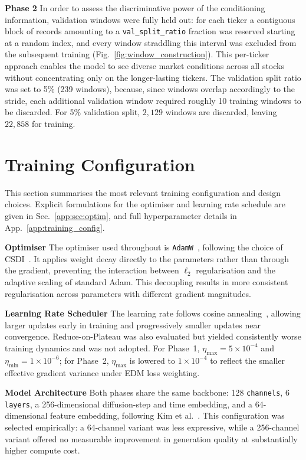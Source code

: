 \textbf{Phase 2} \quad In order to assess the discriminative power of the conditioning information, validation windows were fully held out: for each ticker a contiguous block of records amounting to a \texttt{val\_split\_ratio} fraction was reserved starting at a random index, and every window straddling this interval was excluded from the subsequent training (Fig.\ \ref{fig:window_construction}). This per-ticker approach enables the model to see diverse market conditions across all stocks without concentrating only on the longer-lasting tickers. The validation split ratio was set to 5\% (239 windows), because, since windows overlap accordingly to the stride, each additional validation window required roughly 10 training windows to be discarded. For 5\% validation split, \(2,129\) windows are discarded, leaving \(22,858\) for training.

\section{Training Configuration}
\label{sec:training_config}

This section summarises the most relevant training configuration and design choices. Explicit formulations for the optimiser and learning rate schedule are given in
Sec.\ \ref{app:sec:optim}, and full hyperparameter details in App.\ \ref{app:training_config}.

\textbf{Optimiser} \quad The optimiser used throughout is \texttt{AdamW}\ \cite{loshchilov2019decoupled},
following the choice of CSDI\ \cite{tashiro2021csdi}. It applies weight decay directly
to the parameters rather than through the gradient, preventing the interaction between
$\ell_2$ regularisation and the adaptive scaling of standard Adam. This decoupling results in more consistent regularisation across parameters with different
gradient magnitudes.

\textbf{Learning Rate Scheduler} \quad The learning rate follows cosine
annealing\ \cite{loshchilov2017sgdr}, allowing larger updates early in training and progressively smaller updates near
convergence. Reduce-on-Plateau was also evaluated but yielded consistently worse
training dynamics and was not adopted. For Phase~1, $\eta_{\max} = 5 \times 10^{-4}$
and $\eta_{\min} = 1 \times 10^{-6}$; for Phase~2, $\eta_{\max}$ is lowered to
$1 \times 10^{-4}$ to reflect the smaller effective gradient variance under EDM
loss weighting.

\textbf{Model Architecture} \quad  Both phases share the same backbone: 128 \texttt{channels},
6 \texttt{layers}, a 256-dimensional diffusion-step and time embedding, and a
64-dimensional feature embedding, following Kim et al.\ \cite{kim2025diffusion}.
This configuration was selected empirically: a 64-channel variant was less expressive,
while a 256-channel variant offered no measurable improvement in generation quality at
substantially higher compute cost.

